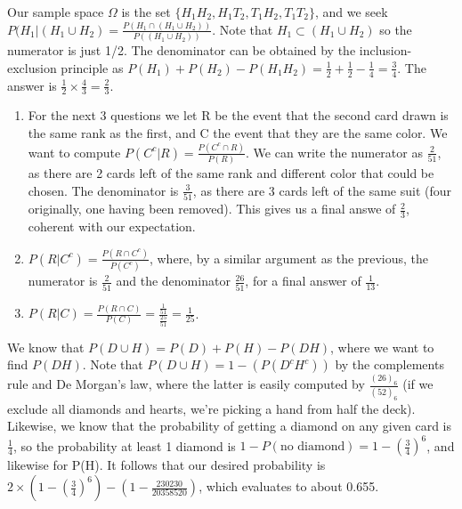 \documentclass{article}
\begin{document}
\begin{prob}
	Our sample space $\Omega$ is the set  $\{H_1H_2, H_1T_2, T_1H_2, T_1T_2\}$, and we seek $P(H_1|(H_1 \cup H_2)=\frac{P(H_1 \cap (H_1 \cup H_2))}{P((H_1 \cup H_2))}$.
	Note that $H_1 \subset (H_1 \cup H_2)$ so the numerator is just 1/2. The denominator can be obtained by the inclusion-exclusion principle as $P(H_1)+P(H_2)-P(H_1H_2)=\frac{1}{2}+\frac{1}{2}-\frac{1}{4}=\frac{3}{4}$. The answer is $\frac{1}{2}\times\frac{4}{3}=\frac{2}{3}$.
\end{prob}

\begin{prob}
	\begin{enumerate}
		\item For the next 3 questions we let R be the event that the second card drawn is the same rank as the first, and C the event that they are the same color.
		We want to compute $P(C^c|R)=\frac{P(C^c \cap R)}{P(R)}$. We can write the numerator as $\frac{2}{51}$, as there are 2 cards left of the same rank and different color that could be chosen.
		The denominator is  $\frac{3}{51}$, as there are 3 cards left of the same suit (four originally, one having been removed). This gives us a final answe of $\frac{2}{3}$, coherent with our expectation.

	\item $P(R|C^c)=\frac{P(R \cap C^c)}{P(C^c)}$, where, by a similar argument as the previous, the numerator is $\frac{2}{51}$ and the denominator $\frac{26}{51}$, for a final answer of $\frac{1}{13}$.
		

	\item $P(R|C)=\frac{P(R \cap C)}{P(C)}=\frac{\frac{1}{51}}{\frac{25}{51}} =\frac{1}{25}$.
	\end{enumerate}
\end{prob}

\begin{prob}	
	We know that $P(D \cup H)=P(D)+P(H)-P(DH)$, where we want to find $P(DH)$. Note that $P(D \cup H)=1-(P(D^cH^c))$ by the complements rule and De Morgan's law, where the latter is easily computed by $\frac{(26)_6}{(52)_6}$ (if we exclude all diamonds and hearts, we're picking a hand from half the deck).
	Likewise, we know that the probability of getting a diamond on any given card is $\frac{1}{4}$, so the probability at least 1 diamond is $1-P(\text{no diamond})=1-(\frac{3}{4})^6$, and likewise for P(H).
	It follows that our desired probability is $2\times(1-(\frac{3}{4})^6)-(1-\frac{230230}{20358520})$, which evaluates to about 0.655.
\end{prob}
\end{document}
